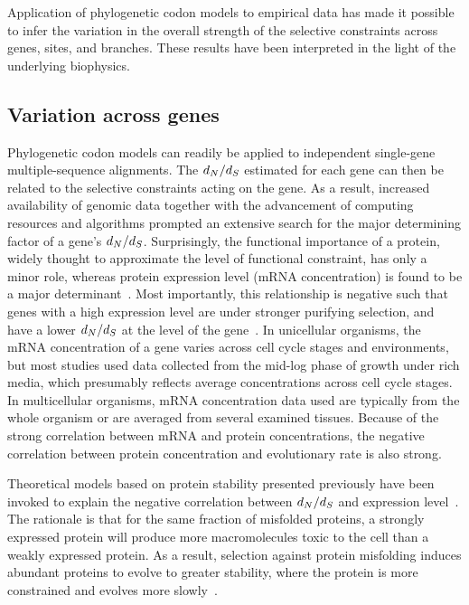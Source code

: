 Application of phylogenetic codon models to empirical data has made it possible to infer the variation in the overall strength of the selective constraints across genes, sites, and branches.
These results have been interpreted in the light of the underlying biophysics.

\subsection{Variation across genes}
\label{subsec:thermo-variation-across-genes}

Phylogenetic codon models can readily be applied to independent single-gene multiple-sequence alignments.
The $d_N / d_S$ estimated for each gene can then be related to the selective constraints acting on the gene.
As a result, increased availability of genomic data together with the advancement of computing resources and algorithms prompted an extensive search for the major determining factor of a gene's $d_N / d_S$.
Surprisingly, the functional importance of a protein, widely thought to approximate the level of functional constraint, has only a minor role, whereas protein expression level (mRNA concentration) is found to be a major determinant~\citep{Zhang2015}.
Most importantly, this relationship is negative such that genes with a high expression level are under stronger purifying selection, and have a lower $d_N / d_S$ at the level of the gene~\citep{Duret2000, Drummond2005a, Zhang2015}.
In unicellular organisms, the mRNA concentration of a gene varies across cell cycle stages and environments, but most studies used data collected from the mid-log phase of growth under rich media, which presumably reflects average concentrations across cell cycle stages.
In multicellular organisms, mRNA concentration data used are typically from the whole organism or are averaged from several examined tissues.
Because of the strong correlation between mRNA and protein concentrations, the negative correlation between protein concentration and evolutionary rate is also strong.

Theoretical models based on protein stability presented previously have been invoked to explain the negative correlation between $d_N / d_S$ and expression level~\citep{Wilke2006, Drummond2008}.
The rationale is that for the same fraction of misfolded proteins, a strongly expressed protein will produce more macromolecules toxic to the cell than a weakly expressed protein.
As a result, selection against protein misfolding induces abundant proteins to evolve to greater stability, where the protein is more constrained and evolves more slowly~\citep{Serohijos2012}.

